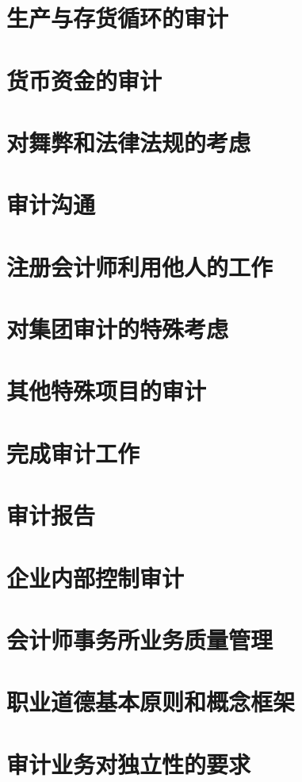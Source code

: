 \documentclass[UTF8,12pt]{ctexart}
\numberwithin{equation}{section} %
\numberwithin{figure}{section}
\numberwithin{table}{section}
\begin{document}
	
	\newpage
	\section{生产与存货循环的审计}
	
	\newpage
	\section{货币资金的审计}
	
	\newpage
	\section{对舞弊和法律法规的考虑}
	
	\newpage
	\section{审计沟通}
	
	\newpage
	\section{注册会计师利用他人的工作}
	
	\newpage
	\section{对集团审计的特殊考虑}
	
	\newpage
	\section{其他特殊项目的审计}
	
	\newpage
	\section{完成审计工作}
	
	\newpage
	\section{审计报告}
	
	\newpage
	\section{企业内部控制审计}
	
	\newpage
	\section{会计师事务所业务质量管理}
	
	\newpage
	\section{职业道德基本原则和概念框架}
	
	\newpage
	\section{审计业务对独立性的要求}
	

	

	
\end{document}
